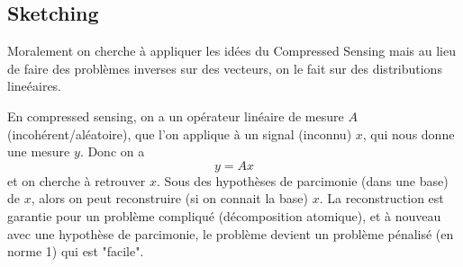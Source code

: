 \documentclass[11pt]{article} %
\begin{document}
\subsection{Sketching}
Moralement on cherche à appliquer les idées du Compressed Sensing mais au lieu de faire des problèmes inverses sur des vecteurs, on le fait sur des distributions lineéaires.
\par
En compressed sensing, on a un opérateur linéaire de mesure $A$ (incohérent/aléatoire), que l'on applique à un signal (inconnu) $x$, qui nous donne une mesure $y$. Donc on a
\begin{equation}
	y = Ax
\end{equation} 
et on cherche à retrouver $x$. Sous des hypothèses de parcimonie (dans une base) de $x$, alors on peut reconstruire (si on connait la base) $x$. La reconstruction est garantie pour un problème compliqué (décomposition atomique), et à nouveau avec une hypothèse de parcimonie, le problème devient un problème pénalisé (en norme 1) qui est "facile".
\end{document}
